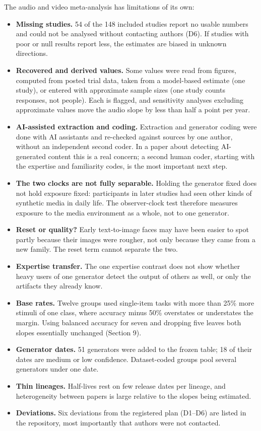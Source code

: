 \documentclass[11pt]{article}
\providecommand{\tightlist}{\setlength{\itemsep}{0pt}\setlength{\parskip}{0pt}}
\begin{document}
The audio and video meta-analysis has limitations of its own:

\begin{itemize}
\tightlist
\item
  \textbf{Missing studies.} 54 of the 148 included studies report no
  usable numbers and could not be analysed without contacting authors
  (D6). If studies with poor or null results report less, the estimates
  are biased in unknown directions.
\item
  \textbf{Recovered and derived values.} Some values were read from
  figures, computed from posted trial data, taken from a model-based
  estimate (one study), or entered with approximate sample sizes (one
  study counts responses, not people). Each is flagged, and sensitivity
  analyses excluding approximate values move the audio slope by less
  than half a point per year.
\item
  \textbf{AI-assisted extraction and coding.} Extraction and generator
  coding were done with AI assistants and re-checked against sources by
  one author, without an independent second coder. In a paper about
  detecting AI-generated content this is a real concern; a second human
  coder, starting with the expertise and familiarity codes, is the most
  important next step.
\item
  \textbf{The two clocks are not fully separable.} Holding the generator
  fixed does not hold exposure fixed: participants in later studies had
  seen other kinds of synthetic media in daily life. The observer-clock
  test therefore measures exposure to the media environment as a whole,
  not to one generator.
\item
  \textbf{Reset or quality?} Early text-to-image faces may have been
  easier to spot partly because their images were rougher, not only
  because they came from a new family. The reset term cannot separate
  the two.
\item
  \textbf{Expertise transfer.} The one expertise contrast does not show
  whether heavy users of one generator detect the output of others as
  well, or only the artifacts they already know.
\item
  \textbf{Base rates.} Twelve groups used single-item tasks with more
  than 25\% more stimuli of one class, where accuracy minus 50\%
  overstates or understates the margin. Using balanced accuracy for
  seven and dropping five leaves both slopes essentially unchanged
  (Section 9).
\item
  \textbf{Generator dates.} 51 generators were added to the frozen
  table; 18 of their dates are medium or low confidence. Dataset-coded
  groups pool several generators under one date.
\item
  \textbf{Thin lineages.} Half-lives rest on few release dates per
  lineage, and heterogeneity between papers is large relative to the
  slopes being estimated.
\item
  \textbf{Deviations.} Six deviations from the registered plan (D1--D6)
  are listed in the repository, most importantly that authors were not
  contacted.
\end{itemize}
\end{document}
